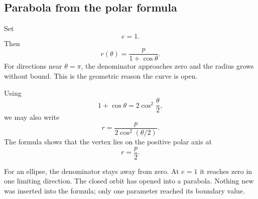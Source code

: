 \subsection{Parabola from the polar formula}

Set
\[
e=1.
\]
Then
\[
\boxed{r(\theta)=\frac{p}{1+\cos\theta}}.
\]
For directions near $\theta=\pi$, the denominator approaches zero and the radius
grows without bound. This is the geometric reason the curve is open.

Using
\[
1+\cos\theta=2\cos^2\frac\theta2,
\]
we may also write
\[
r=\frac{p}{2\cos^2(\theta/2)}.
\]
The formula shows that the vertex lies on the positive polar axis at
\[
\boxed{r=\frac p2}.
\]

\begin{center}
\end{center}

\begin{interpretationbox}
For an ellipse, the denominator stays away from zero. At $e=1$ it reaches zero
in one limiting direction. The closed orbit has opened into a parabola. Nothing
new was inserted into the formula; only one parameter reached its boundary
value.
\end{interpretationbox}
